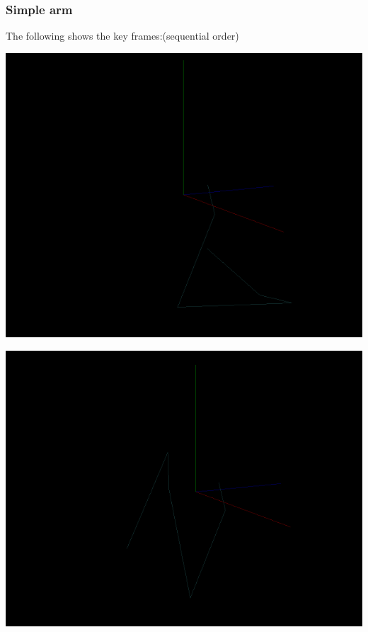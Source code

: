\documentclass[a4paper, 11pt]{article}
\begin{document}
        \subsubsection{Simple arm}
            The following shows the key frames:(sequential order)
            \begin{center}
                \includegraphics[width = \textwidth]{Animation1-1.PNG}
            \end{center}
            \begin{center}
                \includegraphics[width = \textwidth]{Animation1-2.PNG}
            \end{center}
\end{document}
